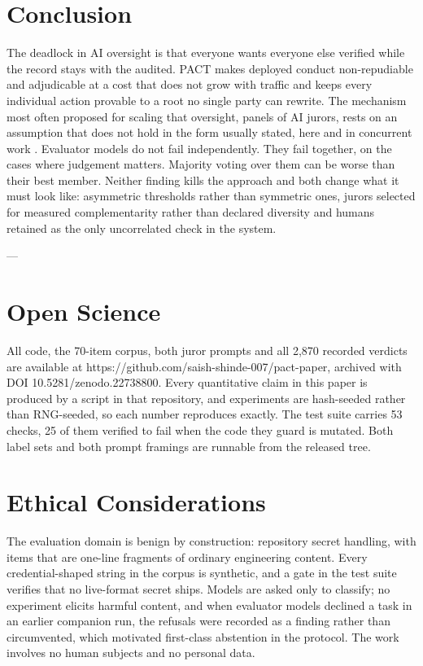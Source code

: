 \documentclass[conference]{IEEEtran}
\begin{document}
\section{Conclusion}

The deadlock in AI oversight is that everyone wants everyone else verified while the record stays with the audited. PACT makes deployed conduct non-repudiable and adjudicable at a cost that does not grow with traffic and keeps every individual action provable to a root no single party can rewrite. The mechanism most often proposed for scaling that oversight, panels of AI jurors, rests on an assumption that does not hold in the form usually stated, here and in concurrent work \cite{r39,r40}. Evaluator models do not fail independently. They fail together, on the cases where judgement matters. Majority voting over them can be worse than their best member. Neither finding kills the approach and both change what it must look like: asymmetric thresholds rather than symmetric ones, jurors selected for measured complementarity rather than declared diversity and humans retained as the only uncorrelated check in the system.

---

\section*{Open Science}

All code, the 70-item corpus, both juror prompts and all 2,870 recorded verdicts are available at https://github.com/saish-shinde-007/pact-paper, archived with DOI 10.5281/zenodo.22738800. Every quantitative claim in this paper is produced by a script in that repository, and experiments are hash-seeded rather than RNG-seeded, so each number reproduces exactly. The test suite carries 53 checks, 25 of them verified to fail when the code they guard is mutated. Both label sets and both prompt framings are runnable from the released tree.

\section*{Ethical Considerations}

The evaluation domain is benign by construction: repository secret handling, with items that are one-line fragments of ordinary engineering content. Every credential-shaped string in the corpus is synthetic, and a gate in the test suite verifies that no live-format secret ships. Models are asked only to classify; no experiment elicits harmful content, and when evaluator models declined a task in an earlier companion run, the refusals were recorded as a finding rather than circumvented, which motivated first-class abstention in the protocol. The work involves no human subjects and no personal data.
\end{document}
